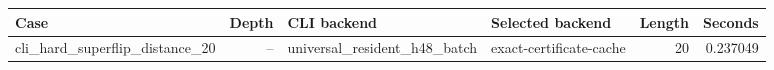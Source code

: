 {\small
\begin{tabular}{lrllrr}
\hline
Case & Depth & CLI backend & Selected backend & Length & Seconds \\
\hline
cli\_hard\_superflip\_distance\_20 & -- & universal\_resident\_h48\_batch & exact-certificate-cache & 20 & 0.237049 \\
\hline
\end{tabular}
}

